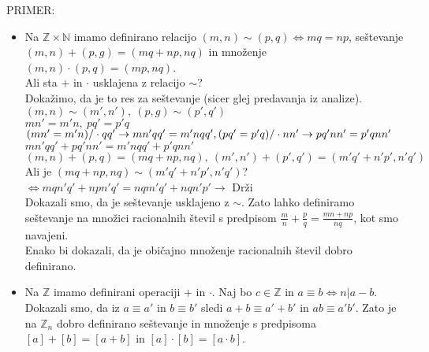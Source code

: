 \documentclass[a4paper,12pt]{article}
\begin{document}
PRIMER:
\begin{itemize}
\item Na $\mathbb{Z}\times \mathbb{N}$ imamo definirano relacijo $(m,n)\sim(p,q)\Leftrightarrow mq=np$, seštevanje \linebreak  $(m,n)+(p,g)=(mq+np,nq)$ in množenje $(m,n)\cdot (p,q)=(mp,nq)$. \\

Ali sta $+$ in $\cdot$ usklajena z relacijo $\sim$?\\

Dokažimo, da je to res za seštevanje (sicer glej predavanja iz analize). \\

$(m,n)\sim(m',n'),~(p,g)\sim (p',q')$ \\

$mn'=m'n,~ pq'=p'q$ \\

$(mn'=m'n)/\cdot qq' \rightarrow mn'qq'=m'nqq', \\
(pq'=p'q)/\cdot nn' \rightarrow pq'nn'=p'qnn'$ \\

$mn'qq'+pq'nn'=m'nqq'+p'qnn'$ \\

$(m,n)+(p,q)=(mq+np,nq),~(m',n')+(p',q')=(m'q'+n'p',n'q')$ \\

Ali je $(mq+np,nq)\sim (m'q'+n'p',n'q')$?\\

$\Leftrightarrow mqn'q'+npn'q'=nqm'q'+nqn'p' \rightarrow$ Drži \\

Dokazali smo, da je seštevanje usklajeno z $\sim$. Zato lahko definiramo seštevanje na množici racionalnih števil s predpisom $\frac{m}{n}+\frac{p}{q}=\frac{mn+np}{nq}$, kot smo navajeni. \\

Enako bi dokazali, da je običajno množenje racionalnih števil dobro definirano. \\

\item Na $\mathbb{Z}$ imamo definirani operaciji $+$ in $\cdot$. Naj bo $c\in \mathbb{Z}$ in $a\equiv b \Leftrightarrow n | a-b$. \\

Dokazali smo, da iz $a\equiv a'$ in $b\equiv b'$ sledi $a+b\equiv a'+b'$ in $ab\equiv a'b'$. Zato je na $\mathbb{Z}_n$ dobro definirano seštevanje in množenje s predpisoma $[a]+[b]=[a+b]$ in $[a]\cdot [b]=[a\cdot b]$. 
\end{itemize}
\end{document}
